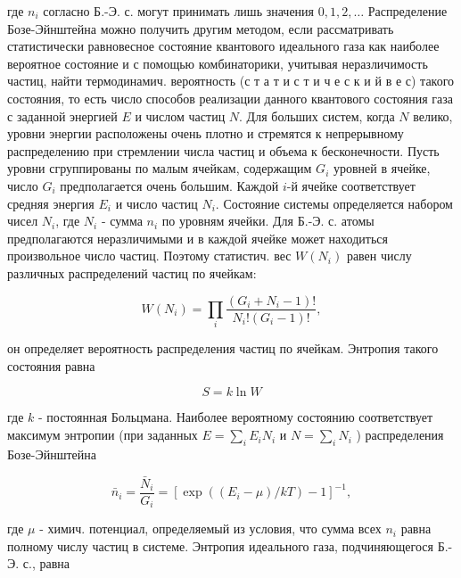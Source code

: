 \documentclass[10pt]{article}
\begin{document}
где $n_{i}$ согласно Б.-Э. с. могут принимать лишь значения $0,1,2, \ldots$ Распределение Бозе-Эйнштейна можно получить другим методом, если рассматривать статистически равновесное состояние квантового идеального газа как наиболее вероятное состояние и с помощью комбинаторики, учитывая неразличимость частиц, найти термодинамич. вероятность (с т а т и с т и ч е с к и й в е с) такого состояния, то есть число способов реализации данного квантового состояния газа с заданной энергией $E$ и числом частиц $N$. Для больших систем, когда $N$ велико, уровни энергии расположены очень плотно и стремятся к непрерывному распределению при стремлении числа частиц и объема к бесконечности. Пусть уровни сгруппированы по малым ячейкам, содержащим $G_{i}$ уровней в ячейке, число $G_{i}$ предполагается очень большим. Каждой $i$-й ячейке соответствует средняя энергия $E_{i}$ и число частиц $N_{i}$. Состояние системы определяется набором чисел $N_{i}$, где $N_{i}$ - сумма $n_{i}$ по уровням ячейки. Для Б.-Э. с. атомы предполагаются неразличимыми и в каждой ячейке может находиться произвольное число частиц. Поэтому статистич. вес $W\left(N_{i}\right)$ равен числу различных распределений частиц по ячейкам:



\[

W\left(N_{i}\right)=\prod_{i} \frac{\left(G_{i}+N_{i}-1\right) !}{N_{i} !\left(G_{i}-1\right) !},

\]



он определяет вероятность распределения частиц по ячейкам. Энтропия такого состояния равна



\[

S=k \ln W

\]



где $k$ - постоянная Больцмана. Наиболее вероятному состоянию соответствует максимум энтропии (при заданных $E=\sum_{i} E_{i} N_{i}$ и $N=\sum_{i} N_{i}$ ) распределения Бозе-Эйнштейна



\[

\bar{n}_{i}=\frac{\bar{N}_{i}}{G_{i}}=\left[\exp \left(\left(E_{i}-\mu\right) / k T\right)-1\right]^{-1},

\]



где $\mu$ - химич. потенциал, определяемый из условия, что сумма всех $n_{i}$ равна полному числу частиц в системе. Энтропия идеального газа, подчиняющегося Б.-Э. с., равна
\end{document}
